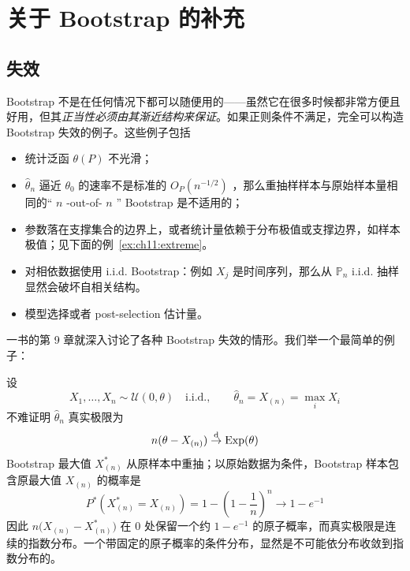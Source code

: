 \section{关于 Bootstrap 的补充}

\subsection{失效}

Bootstrap 不是在任何情况下都可以随便用的------虽然它在很多时候都非常方便且好用，但其\emph{正当性必须由其渐近结构来保证}。如果正则条件不满足，完全可以构造 Bootstrap 失效的例子。这些例子包括

\begin{itemize}
\tightlist
\item
  统计泛函 $\theta(P)$ 不光滑；
\item
  $\widehat\theta_n$ 逼近 $\theta_0$ 的速率不是标准的 $O_P(n^{-1/2})$ ，那么重抽样样本与原始样本量相同的`` $n$ -out-of- $n$ '' Bootstrap 是不适用的；
\item
  参数落在支撑集合的边界上，或者统计量依赖于分布极值或支撑边界，如样本极值；见下面的例~\ref{ex:ch11:extreme}。
\item
  对相依数据使用 i.i.d. Bootstrap：例如 $X_j$ 是时间序列，那么从 $\mathbb P_n$ i.i.d. 抽样显然会破坏自相关结构。
\item
  模型选择或者 post-selection 估计量。
\end{itemize}


\cite{chernick2011} 一书的第 9 章就深入讨论了各种 Bootstrap 失效的情形。我们举一个最简单的例子：

\begin{example}[样本极值]
\label{ex:ch11:extreme}
设
\[X_1,\ldots,X_n\sim \mathcal{U}(0,\theta)\quad \text{i.i.d.}, \qquad \widehat\theta_n=X_{(n)}=\max_i X_i\]
不难证明 $\widehat\theta_n$ 真实极限为
\[n(\theta-X_{(n)})\overset{\rm d}\to \mathrm{Exp}(\theta)\]
Bootstrap 最大值 $X_{(n)}^*$ 从原样本中重抽；以原始数据为条件，Bootstrap 样本包含原最大值 $X_{(n)}$ 的概率是
\[P^*(X_{(n)}^*=X_{(n)}) =1-\left(1-\frac1n\right)^n \to 1-e^{-1}\]
因此 $n\big(X_{(n)}-X_{(n)}^*\big)$ 在 $0$ 处保留一个约 $1-e^{-1}$ 的原子概率，而真实极限是连续的指数分布。一个带固定的原子概率的条件分布，显然是不可能依分布收敛到指数分布的。


\end{example}

